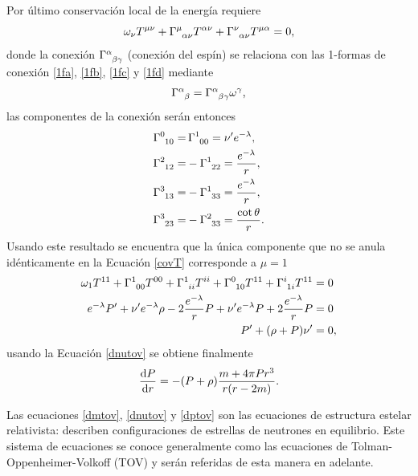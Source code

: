 Por último conservación local de la energía requiere
\begin{equation}
      \omega_{\nu} \tensor{T}{^\mu ^\nu} + \tensor{\Gamma}{^\mu _\alpha _\nu}\tensor{T}{^\alpha ^\nu} + \tensor{\Gamma}{^\nu _\alpha _\nu}\tensor{T}{^\mu ^\alpha} = 0,
\end{equation}
donde la conexión $\tensor{\Gamma}{^\alpha _\beta _\gamma}$ (conexión del espín) se relaciona con las 1-formas de conexión \eqref{1fa}, \eqref{1fb}, \eqref{1fc} y \eqref{1fd} mediante
\begin{equation}
    \tensor{\Gamma}{^\alpha _\beta} = \tensor{\Gamma}{^\alpha _\beta _\gamma} \omega^\gamma, \label{covT}
\end{equation}
las componentes de la conexión serán entonces
\begin{align}
        \tensor{\Gamma}{^0_1_0} =& \,\tensor{\Gamma}{^1_0_0} = \nu^{\prime} e^{-\lambda}, \label{sca} \\
        \tensor{\Gamma}{^2_1_2} =& -\tensor{\Gamma}{^1_2_2} = \frac{e^{-\lambda}}{r}, \label{scb} \\
        \tensor{\Gamma}{^3_1_3} =& -\tensor{\Gamma}{^1_3_3} = \frac{e^{-\lambda}}{r}, \label{scc} \\
        \tensor{\Gamma}{^3_2_3} =& -\tensor{\Gamma}{^2_3_3} = \frac{\cot{\theta}}{r} . \label{scd}
    \end{align}
Usando este resultado se encuentra que la única componente que no se anula idénticamente en la Ecuación \eqref{covT} corresponde a $\mu=1$
\begin{align*}
    \omega_{1} \tensor{T}{^1 ^1} + \tensor{\Gamma}{^1 _0 _0}\tensor{T}{^0 ^0} + \tensor{\Gamma}{^1 _i _i}\tensor{T}{^i ^i} + \tensor{\Gamma}{^0 _1 _0}\tensor{T}{^1 ^1} + \tensor{\Gamma}{^i _1 _i}\tensor{T}{^1 ^1} &= 0 \\
    e^{-\lambda} P^{\prime} + \nu^{\prime} e^{-\lambda} \rho -2 \frac{e^{-\lambda}}{r} P + \nu^{\prime} e^{-\lambda} P  + 2\frac{e^{-\lambda}}{r} P  &= 0 \\
    P^{\prime} + (\rho + P) \nu^{\prime} &= 0,
\end{align*}
usando la Ecuación \eqref{dnutov} se obtiene finalmente
\begin{equation}
    \dv{P}{r} = -(P+\rho)\frac{m+4\pi P r^3}{r\qty(r-2m)}.\label{dptov}
\end{equation}

Las ecuaciones \eqref{dmtov}, \eqref{dnutov} y \eqref{dptov} son las ecuaciones de estructura estelar relativista: describen configuraciones de estrellas de neutrones en equilibrio. Este sistema de ecuaciones se conoce generalmente como las ecuaciones de Tolman-Oppenheimer-Volkoff (TOV)  \cite{Tolman1939,Oppenheimer1939} y serán referidas de esta manera en adelante. 

